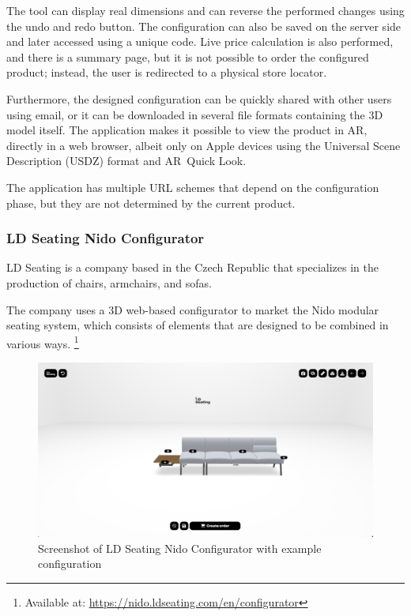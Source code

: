 The tool can display real dimensions and can reverse the performed changes using the undo and redo button. The configuration can also be saved on the server side and later accessed using a unique code. Live price calculation is also performed, and there is a summary page, but it is not possible to order the configured product; instead, the user is redirected to a physical store locator.

Furthermore, the designed configuration can be quickly shared with other users using email, or it can be downloaded in several file formats containing the 3D model itself. The application makes it possible to view the product in AR, directly in a web browser, albeit only on Apple devices using the Universal Scene Description (USDZ) format and AR~Quick Look. \cite{Jackson2018}

The application has multiple URL schemes that depend on the configuration phase, but they are not determined by the current product. 

\subsubsection{LD Seating Nido Configurator}

LD Seating is a company based in the Czech Republic that specializes in the production of chairs, armchairs, and sofas. \cite{LDSeating}

The company uses a 3D web-based configurator to market the Nido modular seating system, which consists of elements that are designed to be combined in various ways. \footnote{Available at: \url{https://nido.ldseating.com/en/configurator}}

\begin{figure}[ht]
\centering
\includegraphics[width=\textwidth]{images/analysis_nido-configurator.png}
\caption{Screenshot of LD Seating Nido Configurator with example configuration}
\end{figure}

